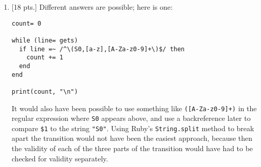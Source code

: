 \documentclass[11pt,fleqn]{article}
\begin{document}
\begin{enumerate}


    \item {[18 pts.]} Different answers are possible; here is one:

          \vspace{-2.75mm}

          \begin{verbatim}
count= 0

while (line= gets)
  if line =~ /^\(S0,[a-z],[A-Za-z0-9]+\)$/ then
    count += 1
  end
end

print(count, "\n")\end{verbatim}

          \vspace{-1mm}

          It would also have been possible to use something like
          \texttt{([A-Za-z0-9]+)} in the regular expression where
          \texttt{S0} appears above, and use a backreference later to
          compare \texttt{\$1} to the string \texttt{"S0"}.  Using Ruby's
          \texttt{String.split} method to break apart the transition would
          not have been the easiest approach, because then the validity of
          each of the three parts of the transition would have had to be
          checked for validity separately.


    \vspace{12mm}

    \raggedcolumns

    \setlength{\columnsep}{16mm}

\end{enumerate}
\end{document}
